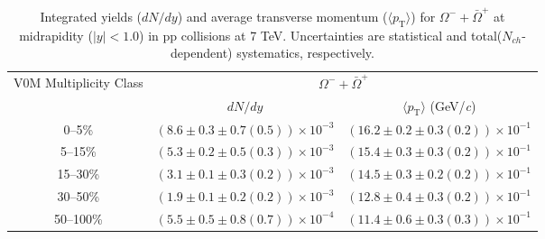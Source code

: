 \begin{table}
\caption{Integrated yields ($dN/dy$) and average transverse momentum ($\langle p_{\mathrm{T}} \rangle$) for $\Omega^{-} + \bar{\Omega}^{+}$ at midrapidity ($|y|<1.0$) in pp collisions at 7 TeV. Uncertainties are statistical and total($N_{ch}$-dependent) systematics, respectively.}
\label{tab:YieldMeanOmegaSum_}
\begin{center}
\begin{tabular}{ c | c c }
\hline
\multirow{2}{*}{V0M Multiplicity Class} & \multicolumn{2}{c}{$\Omega^{-} + \bar{\Omega}^{+}$} \\ 
& $dN/dy$ & $\langle p_{\mathrm{T}} \rangle$ (GeV/\textit{c})\\ 
\hline
0--5\% & $(8.6\pm0.3\pm0.7(0.5))\times10^{-3}$ & $(16.2\pm0.2\pm0.3(0.2))\times10^{-1}$ \\ 
5--15\% & $(5.3\pm0.2\pm0.5(0.3))\times10^{-3}$ & $(15.4\pm0.3\pm0.3(0.2))\times10^{-1}$ \\ 
15--30\% & $(3.1\pm0.1\pm0.3(0.2))\times10^{-3}$ & $(14.5\pm0.3\pm0.2(0.2))\times10^{-1}$ \\ 
30--50\% & $(1.9\pm0.1\pm0.2(0.2))\times10^{-3}$ & $(12.8\pm0.4\pm0.3(0.2))\times10^{-1}$ \\ 
50--100\% & $(5.5\pm0.5\pm0.8(0.7))\times10^{-4}$ & $(11.4\pm0.6\pm0.3(0.3))\times10^{-1}$ \\ 
\hline
\end{tabular}
\end{center}
\end{table}